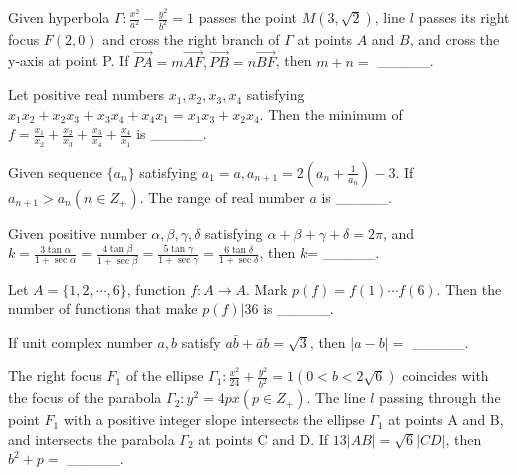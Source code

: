 \begin{problem}\label{AI-Algebra14}
Given hyperbola $\Gamma: \frac{x^2}{a^2}-\frac{y^2}{b^2}=1$ passes the point $M(3,\sqrt{2})$, line $l$ passes its right focus $F(2,0)$ and cross the right branch of $\Gamma$ at points $A$ and $B$, and cross the y-axis at point P. If $\overrightarrow{PA}=m\overrightarrow{AF}, \overrightarrow{PB}=n\overrightarrow{BF}$, then $m+n=$ \_\_\_\_\_.
\end{problem}


\begin{problem}\label{AI-Algebra15}
Let positive real numbers $x_1, x_2, x_3, x_4$ satisfying $x_1x_2+x_2x_3+x_3x_4+x_4x_1=x_1x_3+x_2x_4$. Then the minimum of  $f=\frac{x_1}{x_2}+\frac{x_2}{x_3}+\frac{x_3}{x_4}+\frac{x_4}{x_1}$ is \_\_\_\_\_.
\end{problem}


\begin{problem}\label{AI-Algebra16}
Given sequence $\{a_n\}$ satisfying $a_1=a, a_{n+1}=2(a_n+\frac{1}{a_n})-3$. If $a_{n+1} > a_n (n \in Z_{+})$. The range of real number $a$ is \_\_\_\_\_.
\end{problem}


\begin{problem}\label{AI-Algebra17}
Given positive number $\alpha, \beta, \gamma, \delta $ satisfying $
\alpha+\beta+\gamma+\delta=2\pi$, and $k=\frac{3\tan\alpha}{1+\sec \alpha}=\frac{4\tan \beta}{1+\sec \beta}=\frac{5\tan \gamma}{1+\sec \gamma}=\frac{6\tan\delta}{1+\sec\delta}$, then $k$= \_\_\_\_\_.
\end{problem}


\begin{problem}\label{AI-Algebra18}
Let $A=\{1,2,\cdots,6\}$, function $f:A \rightarrow A$. Mark $p(f)=f(1)\cdots f(6)$. Then the number of functions that make $p(f)|36$ is \_\_\_\_\_.
\end{problem}


\begin{problem}\label{AI-Algebra20}
If unit complex number $a, b$ satisfy $a\bar{b}+\bar{a}b = \sqrt{3}$, then $|a-b|=$ \_\_\_\_\_.
\end{problem}




\begin{problem}\label{AI-Algebra22}
The right focus $F_1$ of the ellipse $\Gamma_1: \frac{x^2}{24}+\frac{y^2}{b^2}=1 (0<b<2\sqrt{6})$ coincides with the focus of the parabola $\Gamma_2: y^2=4px(p \in Z_{+})$. The line $l$ passing through 
the point $F_1$ with a positive integer slope 
intersects the ellipse $\Gamma_1$ at points A and B, 
and intersects the parabola $\Gamma_2$ at points C and D. If $13|AB|=\sqrt{6}|CD|$, then $b^2+p=$ \_\_\_\_\_.
\end{problem}


